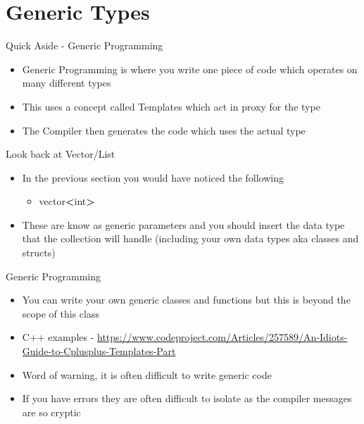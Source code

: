 \part{Generic Types}
\frame{\partpage}

\begin{frame}{Quick Aside - Generic Programming}
	\begin{itemize}
		\pause \item Generic Programming is where you write one piece of code which operates on many different types
		\pause \item This uses a concept called Templates which act in proxy for the type
		\pause \item The Compiler then generates the code which uses the actual type
	\end{itemize}
\end{frame}

\begin{frame}{Look back at Vector/List}
	\begin{itemize}
		\pause \item In the previous section you would have noticed the following
		\begin{itemize}
			\pause \item vector\textbf{\textless}int\textbf{\textgreater}
		\end{itemize} 
		\pause \item These are know as generic parameters and you should insert the data type that the collection will handle (including your own data types aka classes and structs)
	\end{itemize}
\end{frame}

\begin{frame}{Generic Programming}
	\begin{itemize}
		\pause \item You can write your own generic classes and functions but this is beyond the scope of this class
		\pause \item C++ examples - \url{https://www.codeproject.com/Articles/257589/An-Idiots-Guide-to-Cplusplus-Templates-Part}
		\pause \item Word of warning, it is often difficult to write generic code
		\pause \item If you have errors they are often difficult to isolate as the compiler messages are so cryptic
	\end{itemize}
\end{frame}